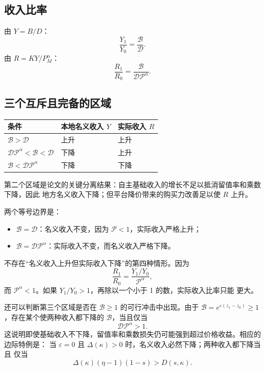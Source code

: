 \documentclass[UTF8,11pt,scheme=chinese,fontset=fandol]{ctexart}
\newcommand{\calB}{\mathcal B}
\newcommand{\calD}{\mathcal D}
\newcommand{\calP}{\mathcal P}
\theoremstyle{definition}
\begin{document}
\subsection{收入比率}

由 \(Y=B/D\)：
\begin{equation}
\frac{Y_1}{Y_0}=\frac{\calB}{\calD}.
\label{teach:eq:Y-ratio}
\end{equation}
由 \(R=KY/P_M^\alpha\)：
\begin{equation}
\frac{R_1}{R_0}
=\frac{\calB}{\calD\calP^\alpha}.
\label{teach:eq:R-ratio}
\end{equation}

\subsection{三个互斥且完备的区域}

\begin{center}
\begin{tabular}{p{5.0cm}p{3.5cm}p{3.5cm}}
\toprule
条件 & 本地名义收入 \(Y\) & 实际收入 \(R\) \\
\midrule
\(\calB>\calD\) & 上升 & 上升 \\
\(\calD\calP^\alpha<\calB<\calD\) & 下降 & 上升 \\
\(\calB<\calD\calP^\alpha\) & 下降 & 下降 \\
\bottomrule
\end{tabular}
\end{center}

第二个区域是论文的关键分离结果：自主基础收入的增长不足以抵消留值率和乘数下降，因此
地方名义收入下降；但平台降价带来的购买力改善足以使 \(R\) 上升。

两个等号边界是：
\begin{itemize}
  \item \(\calB=\calD\)：名义收入不变，因为 \(\calP<1\)，实际收入严格上升；
  \item \(\calB=\calD\calP^\alpha\)：实际收入不变，而名义收入严格下降。
\end{itemize}

不存在“名义收入上升但实际收入下降”的第四种情形。因为
\[
\frac{R_1}{R_0}
=\frac{Y_1/Y_0}{\calP^\alpha},
\]
而 \(\calP^\alpha<1\)。如果 \(Y_1/Y_0>1\)，再除以一个小于 1 的数，实际收入比率只能
更大。

还可以判断第三个区域是否在 \(\calB\geq1\) 的可行冲击中出现。由于
\(\calB=e^{\varepsilon(z_1-z_0)}\geq1\)，存在某个使两种收入都下降的 \(\calB\)，当且仅当
\[
\calD\calP^\alpha>1.
\]
这说明即使基础收入不下降，留值率和乘数损失仍可能强到超过价格收益。相应的边际特例是：
当 \(\varepsilon=0\) 且 \(\Delta(\kappa)>0\) 时，名义收入必然下降；两种收入都下降当且
仅当
\[
\Delta(\kappa)(\eta-1)(1-s)>D(s,\kappa).
\]
\end{document}
